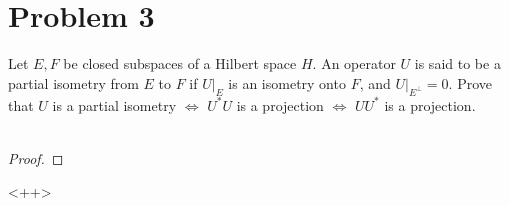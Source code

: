 \documentclass[fontsize=11pt]{scrartcl} %
\numberwithin{equation}{section} %
\numberwithin{figure}{section} %
\numberwithin{table}{section} %
\begin{document}
\newpage

\section*{Problem 3}
Let $E,F$ be closed subspaces of a Hilbert space $H$. An operator $U$ is said to
be a partial isometry from $E$ to $F$ if $U|_E$ is an isometry onto $F$, and
$U|_{E^{\perp}}=0$.
Prove that $U$ is a partial isometry $\iff$ $U^*U$ is a projection $\iff$ $UU^*$
is a projection.
\\
\\
\begin{proof}
    
\end{proof}<++>
\end{document}
